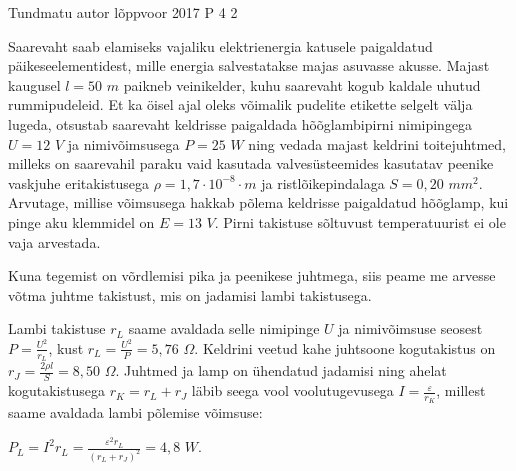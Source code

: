 {Tundmatu autor} %
{lõppvoor} %
{2017} %
{P 4} %
{2} %
{

\ifStatement
Saarevaht saab elamiseks vajaliku elektrienergia katusele paigaldatud päikeseelementidest, mille energia salvestatakse majas asuvasse akusse. Majast kaugusel $l = 50$ $m$ paikneb veinikelder, kuhu saarevaht kogub kaldale uhutud rummipudeleid. Et ka öisel ajal oleks võimalik pudelite etikette selgelt välja lugeda, otsustab saarevaht keldrisse paigaldada hõõglambipirni nimipingega $U = 12$ $V$ ja nimivõimsusega $P = 25$ $W$ ning vedada majast keldrini toitejuhtmed, milleks on saarevahil paraku vaid kasutada valvesüsteemides kasutatav peenike vaskjuhe eritakistusega $\rho = 1,7 \cdot 10^{-8} \cdot m$ ja ristlõikepindalaga $S = 0,20$ $mm^2$. Arvutage, millise võimsusega hakkab põlema keldrisse paigaldatud hõõglamp, kui pinge aku klemmidel on $E = 13$ $V$. Pirni takistuse sõltuvust temperatuurist ei ole vaja arvestada. 
\fi

\ifHint
Kuna tegemist on võrdlemisi pika ja peenikese juhtmega, siis peame me arvesse võtma juhtme takistust, mis on jadamisi lambi takistusega.
\fi

\ifSolution
Lambi takistuse $r_L$ saame avaldada selle nimipinge $U$ ja nimivõimsuse seosest $P = \frac{U^2}{r_L}$, kust $r_L = \frac{U^2}{P} = 5,76$ $\Omega$. Keldrini veetud kahe juhtsoone kogutakistus on $r_J =\frac{ 2 \rho l}{S} = 8,50$ $\Omega$. Juhtmed ja lamp on ühendatud jadamisi ning ahelat kogutakistusega $r_K = r_L + r_J$ läbib seega vool voolutugevusega $I = \frac{\varepsilon}{r_K}$, millest saame avaldada lambi põlemise võimsuse:
\begin{center}
$P_L = I^2 r_L = \frac{\varepsilon ^2 r_L}{(r_L + r_J)^2} = 4,8$ $W$. 
\end{center}
\fi
}